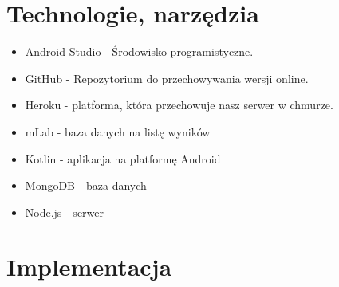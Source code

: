 \documentclass[12pt,a4paper]{article}
\begin{document}
	\section{Technologie, narzędzia}
			\begin{itemize}
			\item Android Studio - Środowisko programistyczne.
			\item GitHub - Repozytorium do przechowywania wersji online.
			\item Heroku - platforma, która przechowuje nasz serwer w chmurze.
			\item mLab - baza danych na listę wyników
			\item Kotlin - aplikacja na platformę Android
			\item MongoDB - baza danych
			\item Node.js - serwer
			\end{itemize}
			\clearpage
	\section{Implementacja}
\end{document}
